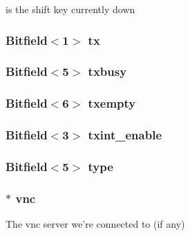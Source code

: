 \label{classPl050_a0a89e7496669527845e89de84902ff53}
is the shift key currently down \hypertarget{classPl050_a429f49b4fd10858ef7c2557020a03d25}{
\subsubsection[{tx}]{\setlength{\rightskip}{0pt plus 5cm}Bitfield$<$1$>$ {\bf tx}}}
\label{classPl050_a429f49b4fd10858ef7c2557020a03d25}
\hypertarget{classPl050_a1d29e46d92d912324287f82c29e23f24}{
\subsubsection[{txbusy}]{\setlength{\rightskip}{0pt plus 5cm}Bitfield$<$5$>$ {\bf txbusy}}}
\label{classPl050_a1d29e46d92d912324287f82c29e23f24}
\hypertarget{classPl050_af389e6d9640f1d43721d64e35c51b99a}{
\subsubsection[{txempty}]{\setlength{\rightskip}{0pt plus 5cm}Bitfield$<$6$>$ {\bf txempty}}}
\label{classPl050_af389e6d9640f1d43721d64e35c51b99a}
\hypertarget{classPl050_a8be90b7eaebfdf66f8f76df2c35749f1}{
\subsubsection[{txint\_\-enable}]{\setlength{\rightskip}{0pt plus 5cm}Bitfield$<$3$>$ {\bf txint\_\-enable}}}
\label{classPl050_a8be90b7eaebfdf66f8f76df2c35749f1}
\hypertarget{classPl050_ae880673634fb4c5ac4c5854a2490401a}{
\subsubsection[{type}]{\setlength{\rightskip}{0pt plus 5cm}Bitfield$<$5$>$ {\bf type}}}
\label{classPl050_ae880673634fb4c5ac4c5854a2490401a}
\hypertarget{classPl050_a52d1b5d3426a30e18a452cd67d87ec13}{
\subsubsection[{vnc}]{$\ast$ {\bf vnc}}}
\label{classPl050_a52d1b5d3426a30e18a452cd67d87ec13}
The vnc server we're connected to (if any) 

